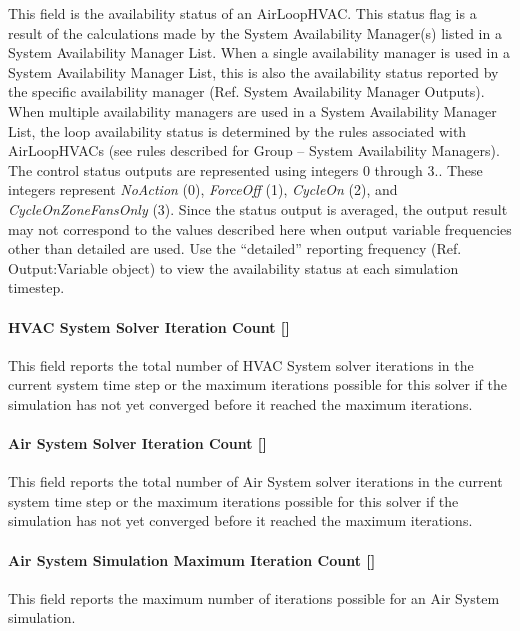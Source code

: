 This field is the availability status of an AirLoopHVAC. This status flag is a result of the calculations made by the System Availability Manager(s) listed in a System Availability Manager List. When a single availability manager is used in a System Availability Manager List, this is also the availability status reported by the specific availability manager (Ref. System Availability Manager Outputs). When multiple availability managers are used in a System Availability Manager List, the loop availability status is determined by the rules associated with AirLoopHVACs (see rules described for Group -- System Availability Managers). The control status outputs are represented using integers 0 through 3.. These integers represent \emph{NoAction} (0), \emph{ForceOff} (1), \emph{CycleOn} (2), and \emph{CycleOnZoneFansOnly} (3). Since the status output is averaged, the output result may not correspond to the values described here when output variable frequencies other than detailed are used. Use the ``detailed'' reporting frequency (Ref. Output:Variable object) to view the availability status at each simulation timestep.

\paragraph{HVAC System Solver Iteration Count {[]}}\label{hvac-system-solver-iteration-count}
This field reports the total number of HVAC System solver iterations in the current system time step or the maximum iterations possible for this solver if the simulation has not yet converged before it reached the maximum iterations.

\paragraph{Air System Solver Iteration Count {[]}}\label{air-system-solver-iteration-count}
This field reports the total number of Air System solver iterations in the current system time step or the maximum iterations possible for this solver if the simulation has not yet converged before it reached the maximum iterations.

\paragraph{Air System Simulation Maximum Iteration Count {[]}}\label{air-system-simulation-maximum-iteration-count}
This field reports the maximum number of iterations possible for an Air System simulation.

